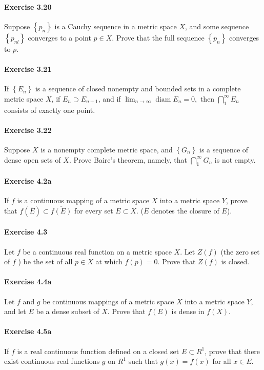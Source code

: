 \documentclass{article}
\begin{document}
\paragraph{Exercise 3.20} Suppose $\left\{p_{n}\right\}$ is a Cauchy sequence in a metric space $X$, and some sequence $\left\{p_{n l}\right\}$ converges to a point $p \in X$. Prove that the full sequence $\left\{p_{n}\right\}$ converges to $p$.

\paragraph{Exercise 3.21} If $\left\{E_{n}\right\}$ is a sequence of closed nonempty and bounded sets in a complete metric space $X$, if $E_{n} \supset E_{n+1}$, and if $\lim _{n \rightarrow \infty} \operatorname{diam} E_{n}=0,$ then $\bigcap_{1}^{\infty} E_{n}$ consists of exactly one point.

\paragraph{Exercise 3.22} Suppose $X$ is a nonempty complete metric space, and $\left\{G_{n}\right\}$ is a sequence of dense open sets of $X$. Prove Baire's theorem, namely, that $\bigcap_{1}^{\infty} G_{n}$ is not empty.

\paragraph{Exercise 4.2a} If $f$ is a continuous mapping of a metric space $X$ into a metric space $Y$, prove that $f(\overline{E}) \subset \overline{f(E)}$ for every set $E \subset X$. ($\overline{E}$ denotes the closure of $E$).

\paragraph{Exercise 4.3} Let $f$ be a continuous real function on a metric space $X$. Let $Z(f)$ (the zero set of $f$ ) be the set of all $p \in X$ at which $f(p)=0$. Prove that $Z(f)$ is closed.

\paragraph{Exercise 4.4a} Let $f$ and $g$ be continuous mappings of a metric space $X$ into a metric space $Y$, and let $E$ be a dense subset of $X$. Prove that $f(E)$ is dense in $f(X)$.

\paragraph{Exercise 4.5a} If $f$ is a real continuous function defined on a closed set $E \subset R^{1}$, prove that there exist continuous real functions $g$ on $R^{1}$ such that $g(x)=f(x)$ for all $x \in E$.
\end{document}
